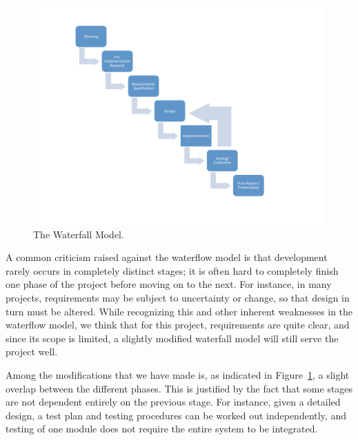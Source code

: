 \begin{figure}[htbp]
\begin{center}
\includegraphics[width = 1.0\textwidth]{PrelimStudy/workflow}
\caption{The Waterfall Model.}
\label{workflow}
\end{center}
\end{figure}

A common criticism raised against the waterflow model is that development rarely occurs in completely distinct stages; it is often hard to completely finish one phase of the project before moving on to the next. For instance, in many projects, requirements may be subject to uncertainty or change, so that design in turn must be altered. While recognizing this and other inherent weaknesses in the waterflow model, we think that for this project, requirements are quite clear, and since its scope is limited, a slightly modified waterfall model will still serve the project well. 

Among the modifications that we have made is, as indicated in Figure~\ref{workflow}, a slight overlap between the different phases. This is justified by the fact that some stages are not dependent entirely on the previous stage. For instance, given a detailed design, a test plan and testing procedures can be worked out independently, and testing of one module does not require the entire system to be integrated.
